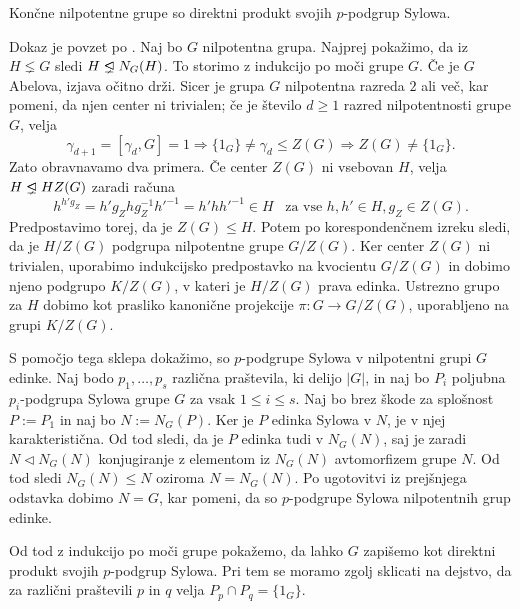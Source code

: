 \begin{trditev}\label{trd_nilpotentne_so_produkti_sylowih}
    Končne nilpotentne grupe so direktni produkt svojih $p$-podgrup Sylowa.
\end{trditev}
\begin{dokaz}
    Dokaz je povzet po \cite[izrek~1.26]{Isaacs_2008}.
    Naj bo $G$ nilpotentna grupa. Najprej pokažimo, da iz $H \lneq G$ sledi $H \propernormalsubgroup N_G(H)$. To storimo z indukcijo po moči grupe $G$.
    Če je $G$ Abelova, izjava očitno drži. Sicer je grupa $G$ nilpotentna razreda $2$ ali več, kar pomeni, da njen center ni trivialen; če je število $d \ge 1$ razred nilpotentnosti grupe $G$, velja \begin{equation*}
        \gamma_{d + 1} = [\gamma_d, G]  = 1 \Longrightarrow  \{ 1_G \} \neq \gamma_d \le Z(G) \Longrightarrow Z(G) \neq \{ 1_G \}.
    \end{equation*} 
     Zato obravnavamo dva primera. Če center $Z(G)$ ni vsebovan $H$, velja \\ $H \propernormalsubgroup H Z(G)$ zaradi računa \begin{equation*}
        h^{h' g_Z} = h' g_Z h g_Z^{-1} h'^{-1} = h' h h'^{-1} \in H \, \, \, \text{ za vse } h, h' \in H, g_Z \in Z(G).
    \end{equation*}
    Predpostavimo torej, da je $Z(G) \le H$. Potem po korespondenčnem izreku sledi, da je $H / Z(G)$ podgrupa nilpotentne grupe $G / Z(G)$.
    Ker center $Z(G)$ ni trivialen, uporabimo indukcijsko predpostavko na kvocientu $G / Z(G)$ in dobimo njeno podgrupo $K / Z(G)$, v kateri je $H/ Z(G)$ prava edinka.
    Ustrezno grupo za $H$ dobimo kot prasliko kanonične projekcije $\pi : G \to G / Z(G)$, uporabljeno na grupi $ K / Z(G)$.
    
    S pomočjo tega sklepa dokažimo, so $p$-podgrupe Sylowa v nilpotentni grupi $G$ edinke. Naj bodo $p_1, \ldots , p_s$ različna praštevila, ki delijo $\lvert G \rvert$, in naj bo $P_i$ poljubna $p_i$-podgrupa Sylowa grupe $G$ za vsak $1 \le i \le s$.
    Naj bo brez škode za splošnost $P := P_1$ in naj bo $N := N_G(P)$. Ker je $P$ edinka Sylowa v $N$, je v njej karakteristična. Od tod sledi, da je $P$ edinka tudi v $N_G(N)$, saj je zaradi $N \triangleleft N_G(N)$ konjugiranje z elementom iz $N_G(N)$
    avtomorfizem grupe $N$. Od tod sledi $N_G(N) \le N$ oziroma $N = N_G(N)$. Po ugotovitvi iz prejšnjega odstavka dobimo $N = G$, kar pomeni, da so $p$-podgrupe Sylowa nilpotentnih grup edinke.
    
    Od tod z indukcijo po moči grupe pokažemo, da lahko $G$ zapišemo kot direktni produkt svojih $p$-podgrup Sylowa. Pri tem se moramo zgolj
    sklicati na dejstvo, da za različni praštevili $p$ in $q$ velja $P_p \cap P_q = \{ 1_G \}$.
\end{dokaz}

